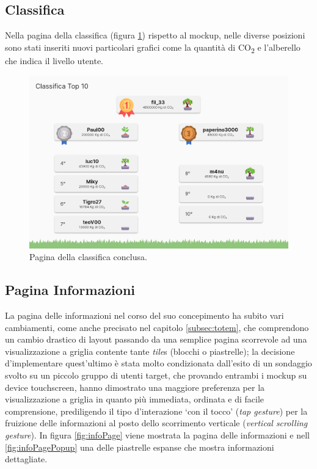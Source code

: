 %
%
\subsection{Classifica}
Nella pagina della classifica (figura \ref{fig:top10screen}) rispetto al mockup, nelle diverse posizioni sono stati inseriti nuovi particolari grafici come la quantità di CO\textsubscript{2} e l'alberello che indica il livello utente.
\begin{figure}[h]
  \centering
  \includegraphics[width=\textwidth]{img/totem/screenshot/top10screen.png}
  \caption{Pagina della classifica conclusa.}
  \label{fig:top10screen}
\end{figure}

%
%
\subsection{Pagina Informazioni}
La pagina delle informazioni nel corso del suo concepimento ha subito vari cambiamenti, come anche precisato nel capitolo \ref{subsec:totem}, che comprendono un cambio drastico di layout passando da una semplice pagina scorrevole ad una visualizzazione a griglia contente tante \textit{tile}s (blocchi o piastrelle); la decisione d'implementare quest'ultimo è stata molto condizionata dall'esito di un sondaggio svolto su un piccolo gruppo di utenti target, che provando entrambi i mockup su device touchscreen, hanno dimostrato una maggiore preferenza per la visualizzazione a griglia in quanto più immediata, ordinata e di facile comprensione, prediligendo il tipo d'interazione \enquote*{con il tocco} (\textit{tap gesture}) per la fruizione delle informazioni al posto dello scorrimento verticale (\textit{vertical scrolling gesture}). In figura \ref{fig:infoPage} viene mostrata la pagina delle informazioni e nell \ref{fig:infoPagePopup} una delle piastrelle espanse che mostra informazioni dettagliate.

